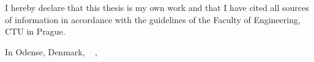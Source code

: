 \begin{declaration}
I hereby declare that this thesis is my own work and that I have cited all sources of information in accordance with the guidelines of the Faculty of Engineering, CTU in Prague.

In Odense, Denmark, ~ ,~
\end{declaration}